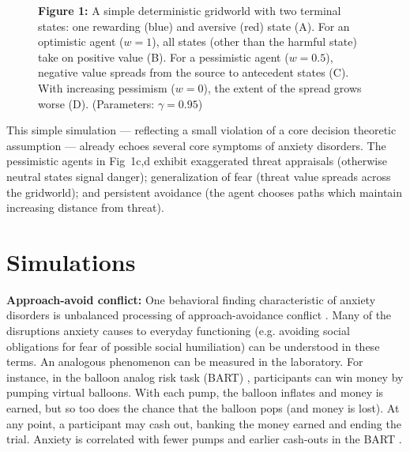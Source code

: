 \documentclass[11pt]{article} %
\begin{document}
\begin{figure}
  \centerline{%
  }
  \par \textbf{Figure 1:} A simple deterministic gridworld with two terminal states: one rewarding (blue) and aversive (red) state (A). For an optimistic agent ($w=1$), all states (other than the harmful state) take on positive value (B). For a pessimistic agent ($w=0.5$), negative value spreads from the source to antecedent states (C). With increasing pessimism ($w=0$), the extent of the spread grows worse (D). (Parameters: $\gamma = 0.95$)
\end{figure}

This simple simulation --- reflecting a small violation of a core decision theoretic assumption --- already echoes several core symptoms of anxiety disorders. The pessimistic agents in Fig~1c,d exhibit exaggerated threat appraisals (otherwise neutral states signal danger); generalization of fear (threat value spreads across the gridworld); and persistent avoidance (the agent chooses paths which maintain increasing distance from threat).

\section{Simulations}
\textbf{Approach-avoid conflict:} One behavioral finding characteristic of anxiety disorders is unbalanced processing of approach-avoidance conflict \citep{aupperle2010}. Many of the disruptions anxiety causes to everyday functioning (e.g. avoiding social obligations for fear of possible social humiliation) can be understood in these terms. An analogous phenomenon can be measured in the laboratory. For instance, in the balloon analog risk task (BART) \citep{Lejuez2002}, participants can win money by pumping virtual balloons. With each pump, the balloon inflates and money is earned, but so too does the chance that the balloon pops (and money is lost). At any point, a participant may cash out, banking the money earned and ending the trial. Anxiety is correlated with fewer pumps and earlier cash-outs in the BART \citep{Maner2007, ramirez2015}.
\end{document}
